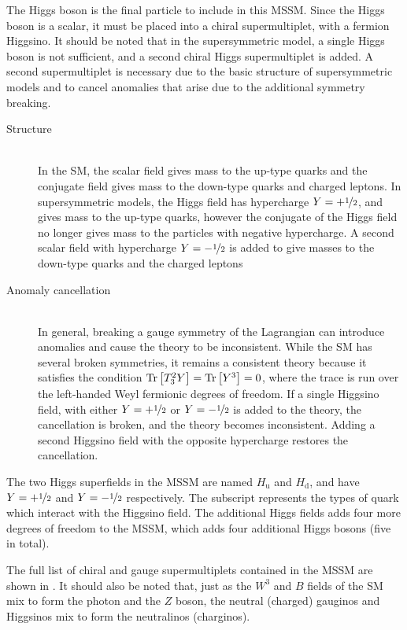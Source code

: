 The Higgs boson is the final particle to include in this MSSM.
Since the Higgs boson is a scalar, it must be placed into a chiral
supermultiplet, with a fermion Higgsino.
It should be noted that in the supersymmetric model, a single Higgs boson is
not sufficient, and a second chiral Higgs supermultiplet is added.
A second supermultiplet is necessary due to the basic structure of
supersymmetric models and to cancel anomalies that arise due to the additional
symmetry breaking.
\begin{description}
  \item[Structure] \hfill \\
    In the SM, the scalar field gives mass to the
    up-type quarks and the conjugate field gives mass to the down-type quarks
    and charged leptons.
    In supersymmetric models, the Higgs field has hypercharge
    $Y=+\nicefrac{1}{2}$, and gives mass to the up-type quarks, however the
    conjugate of the Higgs field no longer gives mass to the particles with
    negative hypercharge.
    A second scalar field with hypercharge $Y=-\nicefrac{1}{2}$ is added to
    give masses to the down-type quarks and the charged leptons
  \item[Anomaly cancellation] \hfill \\
    In general, breaking a gauge symmetry of the Lagrangian can introduce
    anomalies and cause the theory to be inconsistent.
    While the SM has several broken symmetries, it remains a consistent theory
    because it satisfies the condition
    $\Tr\left[ T_3^2 Y \right] = \Tr\left[ Y^3 \right] = 0$, where the trace
    is run over the left-handed Weyl fermionic degrees of freedom.
    If a single Higgsino field, with either $Y=+\nicefrac{1}{2}$ or
    $Y=-\nicefrac{1}{2}$ is added to the theory, the cancellation is broken,
    and the theory becomes inconsistent.
    Adding a second Higgsino field with the opposite hypercharge restores the
    cancellation.
\end{description}
The two Higgs superfields in the MSSM are named $H_\mathrm{u}$ and
$H_\mathrm{d}$,
and have $Y=+\nicefrac{1}{2}$ and $Y=-\nicefrac{1}{2}$ respectively.
The subscript represents the types of quark which interact with the Higgsino
field.
The additional Higgs fields adds four more degrees of freedom to the MSSM,
which adds four additional Higgs bosons (five in total).

The full list of chiral and gauge supermultiplets contained in the MSSM are
shown in .
It should also be noted that, just as the $W^3$ and $B$ fields of the SM mix to
form the photon and the $Z$ boson, the
neutral (charged) gauginos and Higgsinos mix to form the
neutralinos (charginos).

